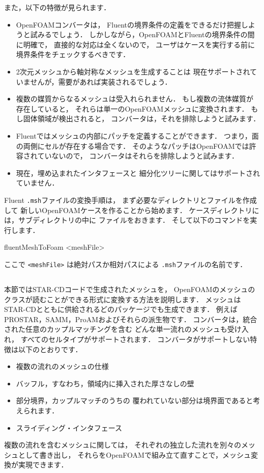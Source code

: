 また，以下の特徴が見られます．
\begin{itemize}
 \item OpenFOAMコンバータは，
       Fluentの境界条件の定義をできるだけ把握しようと試みるでしょう．
       しかしながら，OpenFOAMとFluentの境界条件の間に明確で，
       直接的な対応は全くないので，
       ユーザはケースを実行する前に境界条件をチェックするべきです．
 \item 2次元メッシュから軸対称なメッシュを生成することは
       現在サポートされていませんが，需要があれば実装されるでしょう．
 \item 複数の媒質からなるメッシュは受入れられません．
       もし複数の流体媒質が存在していると，
       それらは単一のOpenFOAMメッシュに変換されます．
       もし固体領域が検出されると，
       コンバータは，それを排除しようと試みます．
 \item Fluentではメッシュの内部にパッチを定義することができます．
       つまり，面の両側にセルが存在する場合です．
       そのようなパッチはOpenFOAMでは許容されていないので，
       コンバータはそれらを排除しようと試みます．
 \item 現在，埋め込まれたインタフェースと
       細分化ツリーに関してはサポートされていません．
\end{itemize}
Fluent \texttt{.msh}ファイルの変換手順は，
まず必要なディレクトリとファイルを作成して
新しいOpenFOAMケースを作ることから始めます．
ケースディレクトリには，サブディレクトリの中に
ファイルをおきます．
そして以下のコマンドを実行します．
\begin{OFverbatim}[terminal]
fluentMeshToFoam <meshFile>
\end{OFverbatim}
ここで \texttt{<meshFile>} は絶対パスか相対パスによる
\texttt{.msh}ファイルの名前です．


\subsection{}
\label{ssec:5.5.2}
本節ではSTAR-CDコードで生成されたメッシュを，
OpenFOAMのメッシュのクラスが読むことができる形式に変換する方法を説明します．
メッシュはSTAR-CDとともに供給されるどのパッケージでも生成できます．
例えばPROSTAR，SAMM，ProAMおよびそれらの派生物です．
コンバータは，統合された任意のカップルマッチングを含む
どんな単一流れのメッシュも受け入れ，
すべてのセルタイプがサポートされます．
コンバータがサポートしない特徴は以下のとおりです．
\begin{itemize}
 \item 複数の流れのメッシュの仕様
 \item バッフル，すなわち，領域内に挿入された厚さなしの壁
 \item 部分境界，カップルマッチのうちの
       覆われていない部分は境界面であると考えられます．
 \item スライディング・インタフェース
\end{itemize}
複数の流れを含むメッシュに関しては，
それぞれの独立した流れを別々のメッシュとして書き出し，
それらをOpenFOAMで組み立て直すことで，メッシュ変換が実現できます．

